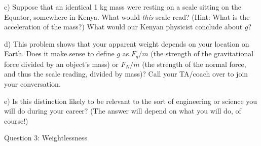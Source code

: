 \documentclass[12pt]{article}
\begin{document}
\newpage

c) Suppose that an identical 1 kg mass were resting on a scale sitting on the Equator, somewhere in Kenya. What would {\it this} scale read? (Hint: What is the acceleration of the mass?) What would our Kenyan physicist conclude about $g$?
%
%	
%	

\vspace{3in}

d) This problem shows that your apparent weight depends on your location on Earth. 
Does it make sense to define $g$ as $F_g/m$ 
(the strength of the gravitational force divided by an object's mass) or
$F_N/m$ (the strength of the normal force, and thus the scale reading, divided by mass)? Call your TA/coach over to join your conversation.

\vspace{1in}

%	


e) Is this distinction likely to be relevant to the sort of engineering or science you will do during your
career? (The answer will depend on what you will do, of course!)


%
%
%
%
%
%
%
%
%
%
%
\newpage
\centerline{\Large Question 3: Weightlessness}
\end{document}
